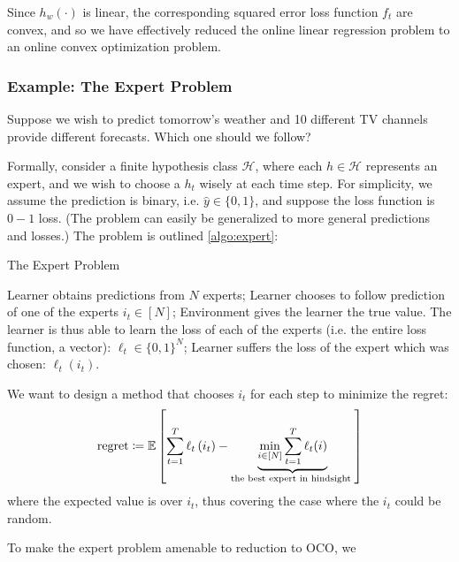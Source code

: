 \documentclass{article}
\newcommand{\re}{\operatorname{regret}}
\begin{document}
Since $h_{w}(\cdot)$ is linear, the corresponding squared error loss function $f_{t}$ are convex, and so we have effectively reduced the online linear regression problem to an online convex optimization problem.

\subsubsection{Example: The Expert Problem}
Suppose we wish to predict tomorrow's weather and 10 different TV channels provide different forecasts. Which one should we follow? 

Formally, consider a finite hypothesis class $\mathcal{H}$, where each $h \in \mathcal{H}$ represents an expert, and we wish to choose a $h_{t}$ wisely at each time step. For simplicity, we assume the prediction is
binary, i.e. $\hat{y} \in\{0,1\}$, and suppose the loss function is $0-1$ loss. (The problem can easily be generalized to more general predictions and losses.) The problem is outlined \cref{algo:expert}:
\begin{algorithm}[H]
    \caption{The Expert Problem}\label{algo:expert}
    \begin{algorithmic}[1]
                \STATE Learner obtains predictions from $N$ experts; 
                \STATE Learner chooses to follow prediction of one of the experts $i_{t} \in [N]$;
                \STATE Environment gives the learner the true value. The learner is thus able to learn the loss of each of the experts (i.e. the entire loss function, a vector): $\ell_{t} \in\{0,1\}^{N}$;
                \STATE Learner suffers the loss of the expert which was chosen: $\ell_{t}\left(i_{t}\right)$.
        \ENDFOR
    \end{algorithmic}
\end{algorithm}

We want to design a method that chooses $i_{t}$ for each step to minimize the regret:
\begin{align*}
\re \coloneqq \E[\sum_{t=1}^{T} \ell_{t}\left(i_{t}\right)-\underbrace{\min _{i \in[N]} \sum_{t=1}^{T} \ell_{t}(i)}_{\text {the best expert in hindsight }}]
\end{align*}
where the expected value is over $i_{t}$, thus covering the case where the $i_{t}$ could be random.


To make the expert problem amenable to reduction to OCO, we 
\end{document}
